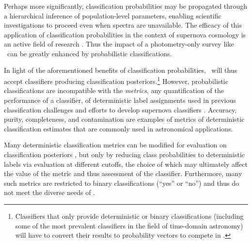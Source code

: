 Perhaps more significantly, classification probabilities may be propagated through a hierarchical inference of population-level parameters, enabling scientific investigations to proceed even when spectra are unavailable.
The efficacy of this application of classification probabilities in the context of supernova cosmology is an active field of research \citep{2015ApJ...813..137R, roberts_zbeams:_2017, 2018ApJ...857...51J, scippr}.
Thus the impact of a photometry-only survey like \lsst\ can be greatly enhanced by probabilistic classifications.

In light of the aforementioned benefits of classification probabilities, \plasticc\ will thus accept classifiers producing classification posteriors.\footnote{Classifiers that only provide deterministic or binary classifications (including some of the most prevalent classifiers in the field of time-domain astronomy) will have to convert their results to probability vectors to compete in \plasticc.}
However, probabilistic classifications are incompatible with the \textit{metrics}, any quantification of the performance of a classifier, of deterministic label assignments used in previous classification challenges \citep{kessler_supernova_2010, kessler_results_2010} and efforts to develop supernova classifiers \citep{narayan_machine_2018}.
Accuracy, purity, completeness, and contamination are examples of metrics of deterministic classification estimates that are commonly used in astronomical applications.

Many deterministic classification metrics can be modified for evaluation on classification posteriors \citep{gieseke_detecting_2010, lochner_photometric_2016, moller_photometric_2016, hon_deep_2017, hon_detecting_2018}, but only by reducing class probabilities to deterministic labels via evaluation at different cutoffs, the choice of which may ultimately affect the value of the metric and thus assessment of the classifier.
Furthermore, many such metrics are restricted to binary classifications (``yes'' or ``no'') and thus do not meet the diverse needs of \plasticc.

